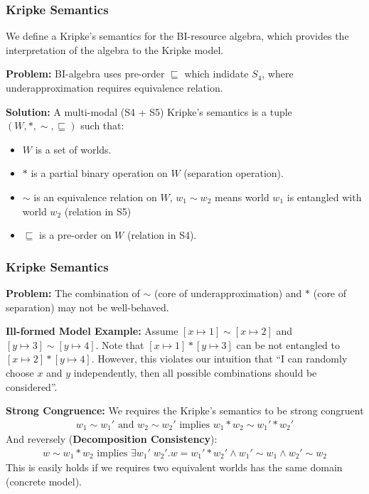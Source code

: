 \begin{frame}[fragile]
    \frametitle{Kripke Semantics}

We define a Kripke's semantics for the BI-resource algebra, which provides the interpretation of the algebra to the Kripke model.

\textbf{Problem:} BI-algebra uses pre-order $\sqsubseteq$ which indidate $S_4$, where underapproximation requires equivalence relation.

\textbf{Solution:} A multi-modal (S4 + S5) Kripke's semantics is a tuple $(W, *, \sim, \sqsubseteq)$ such that:
\begin{itemize}
    \item $W$ is a set of worlds.
    \item $*$ is a partial binary operation on $W$ (separation operation).
    \item $\sim$ is an equivalence relation on $W$, $w_1 \sim w_2$ means world $w_1$ is entangled with world $w_2$ (relation in S5)
    \item $\sqsubseteq$ is a pre-order on $W$ (relation in S4).
\end{itemize}

\end{frame}

\begin{frame}[fragile]
    \frametitle{Kripke Semantics}

\textbf{Problem:} The combination of $\sim$ (core of underapproximation) and $*$ (core of separation) may not be well-behaved.

\textbf{Ill-formed Model Example:} Assume $[x\mapsto 1] \sim [x\mapsto 2]$ and $[y\mapsto 3] \sim [y\mapsto 4]$. Note that $[x\mapsto 1] * [y\mapsto 3]$ can be not entangled to $[x\mapsto 2] * [y\mapsto 4]$. However, this violates our intuition that ``I can randomly choose $x$ and $y$ independently, then all possible combinations should be considered''.

\textbf{Strong Congruence:} We requires the Kripke's semantics to be strong congruent
\begin{align*}
    w_1 \sim w_1' \text{ and } w_2 \sim w_2' \text{ implies } w_1 * w_2 \sim w_1' * w_2'
\end{align*}\noindent
And reversely (\textbf{Decomposition Consistency}):
\begin{align*}
    w \sim w_1 * w_2 \text{ implies } \exists w_1'\; w_2'. w = w_1' * w_2' \land w_1' \sim w_1 \land w_2' \sim w_2
\end{align*}\noindent
This is easily holds if we requires two equivalent worlds has the same domain (concrete model).

\end{frame}

